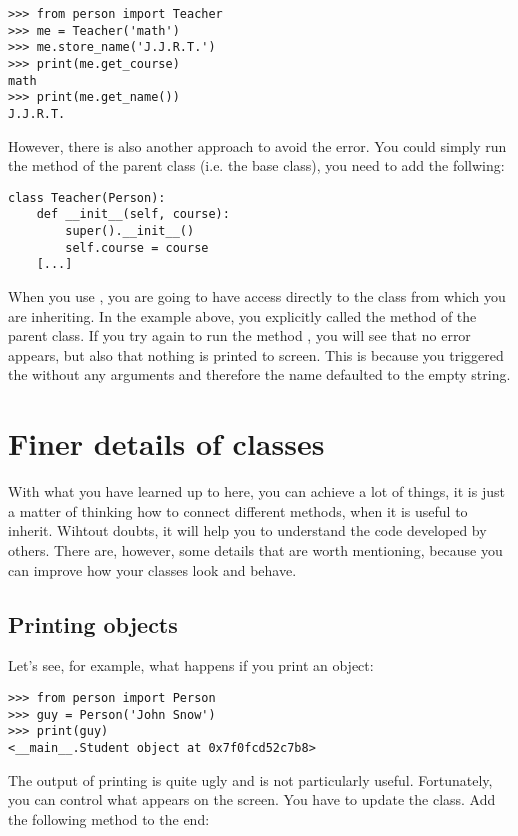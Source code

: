 \begin{verbatim}
>>> from person import Teacher
>>> me = Teacher('math')
>>> me.store_name('J.J.R.T.')
>>> print(me.get_course)
math
>>> print(me.get_name())
J.J.R.T.
\end{verbatim}

However, there is also another approach to avoid the error. You could simply run the  method of the parent class (i.e. the base class), you need to add the follwing:

\begin{verbatim}
class Teacher(Person):
    def __init__(self, course):
        super().__init__()
        self.course = course
    [...]
\end{verbatim}

When you use , you are going to have access directly to the class from which you are inheriting. In the example above, you explicitly called the  method of the parent class. If you try again to run the method , you will see that no error appears, but also that nothing is printed to screen. This is because you triggered the  without any arguments and therefore the name defaulted to the empty string. 


\section{Finer details of classes}
With what you have learned up to here, you can achieve a lot of things, it is just a matter of thinking how to connect different methods, when it is useful to inherit. Wihtout doubts, it will help you to understand the code developed by others. There are, however, some details that are worth mentioning, because you can improve how your classes look and behave. 

\subsection{Printing objects}
Let's see, for example, what happens if you print an object:
\begin{verbatim}
>>> from person import Person
>>> guy = Person('John Snow')
>>> print(guy)
<__main__.Student object at 0x7f0fcd52c7b8>
\end{verbatim}
The output of printing  is quite ugly and is not particularly useful. Fortunately, you can control what appears on the screen. You have to update the  class. Add the following method to the end:

